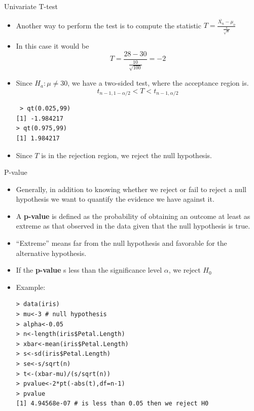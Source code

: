 \documentclass[handout]{beamer}
\begin{document}
\begin{frame}[fragile]{Univariate T-test}
\scriptsize{
\begin{itemize}
 \item Another way to perform the test is to compute the statistic  $T=\frac{\overline{X_{n}}-\mu_{o}}{\frac{s}{\sqrt{n}}}$
 \item  In this case it would be \begin{displaymath}
                           T=\frac{28-30}{\frac{10}{\sqrt{100}}}=-2
                          \end{displaymath}
\item Since $H_{a}: \mu \neq 30$, we have a two-sided test, where the acceptance region is.
\begin{displaymath}
 t_{n-1,1-\alpha/2}<T<t_{n-1,\alpha/2}
\end{displaymath}
\begin{verbatim}
 > qt(0.025,99)
[1] -1.984217
> qt(0.975,99)
[1] 1.984217
\end{verbatim}
\item Since $T$ is in the rejection region, we reject the null hypothesis.

\end{itemize}



} 
\end{frame}


\begin{frame}[fragile]{P-value}
\scriptsize{
\begin{itemize}
 \item Generally, in addition to knowing whether we reject or fail to reject a null hypothesis we want to quantify the evidence we have against it.
 \item A \textbf{p-value} is defined as the probability of obtaining an outcome at least as extreme as that observed in the data given that the null hypothesis is true.
 \item ``Extreme'' means far from the null hypothesis and favorable for the alternative hypothesis.
 \item If the \textbf{p-value} s less than the significance level $\alpha$, we reject $H_{0}$ 
 \item Example:
\begin{verbatim}
> data(iris)
> mu<-3 # null hypothesis
> alpha<-0.05
> n<-length(iris$Petal.Length)
> xbar<-mean(iris$Petal.Length)
> s<-sd(iris$Petal.Length)
> se<-s/sqrt(n)
> t<-(xbar-mu)/(s/sqrt(n))
> pvalue<-2*pt(-abs(t),df=n-1)
> pvalue
[1] 4.94568e-07 # is less than 0.05 then we reject H0
\end{verbatim}
\end{itemize}

 


}
\end{frame}
\end{document}
